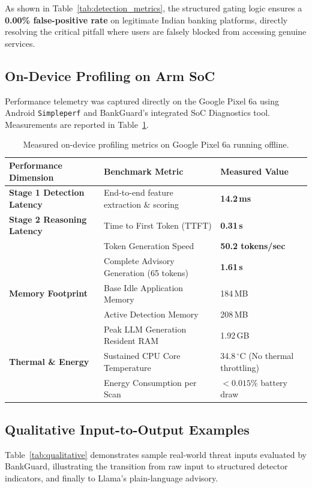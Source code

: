 \documentclass[11pt,a4paper]{article}
\begin{document}
As shown in Table~\ref{tab:detection_metrics}, the structured gating logic ensures a \textbf{0.00\% false-positive rate} on legitimate Indian banking platforms, directly resolving the critical pitfall where users are falsely blocked from accessing genuine services.

\subsection{On-Device Profiling on Arm SoC}
Performance telemetry was captured directly on the Google Pixel 6a using Android \texttt{Simpleperf} and BankGuard's integrated SoC Diagnostics tool. Measurements are reported in Table~\ref{tab:profiling}.

\begin{table}[ht!]
\centering
\small
\begin{tabular}{lll}
\toprule
\textbf{Performance Dimension} & \textbf{Benchmark Metric} & \textbf{Measured Value} \\
\midrule
\textbf{Stage 1 Detection Latency} & End-to-end feature extraction \& scoring & \textbf{14.2\,ms} \\
\textbf{Stage 2 Reasoning Latency} & Time to First Token (TTFT) & \textbf{0.31\,s} \\
& Token Generation Speed & \textbf{50.2 tokens/sec} \\
& Complete Advisory Generation (65 tokens) & \textbf{1.61\,s} \\
\midrule
\textbf{Memory Footprint} & Base Idle Application Memory & 184\,MB \\
& Active Detection Memory & 208\,MB \\
& Peak LLM Generation Resident RAM & 1.92\,GB \\
\midrule
\textbf{Thermal \& Energy} & Sustained CPU Core Temperature & 34.8\,$^\circ$C (No thermal throttling) \\
& Energy Consumption per Scan & $< 0.015$\% battery draw \\
\bottomrule
\end{tabular}
\caption{Measured on-device profiling metrics on Google Pixel 6a running offline.}
\label{tab:profiling}
\end{table}

\subsection{Qualitative Input-to-Output Examples}
Table~\ref{tab:qualitative} demonstrates sample real-world threat inputs evaluated by BankGuard, illustrating the transition from raw input to structured detector indicators, and finally to Llama's plain-language advisory.
\end{document}
